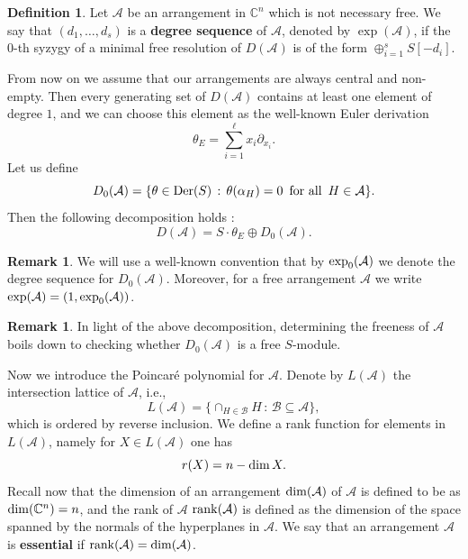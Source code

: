 \documentclass[11pt]{article}
\theoremstyle{plain}
\theoremstyle{definition}
\newtheorem{definition}[thm]{Definition}
\newtheorem{remark}[thm]{Remark}
\begin{document}
\begin{definition}
	Let $\mathcal{A}$ be an arrangement in $\mathbb{C}^n$ which is not necessary free. We say that 
	$(d_1,\ldots,d_s)$ is a \textbf{degree sequence} of $\mathcal{A}$, denoted by $\exp(\mathcal{A})$,  if 
	the $0$-th syzygy of a minimal free resolution of $D(\mathcal{A})$ is of the form 
	$\oplus_{i=1}^s S[-d_i]$.
	\label{degreesequence}
\end{definition}
From now on we assume that our arrangements are always central and non-empty. Then every generating set of $D(\mathcal{A})$ contains at least one element of degree $1$, and we can choose this element as the well-known Euler derivation
$$\theta_{E} = \sum_{i=1}^{\ell}x_{i} \partial_{x_{i}}.$$
Let us define
$$D_{0}(\mathcal{A}) = \{\theta \in {\rm Der}(S) \, : \, \theta(\alpha_{H}) = 0 \, \text{ for all } \, H \in \mathcal{A}\}.$$
Then the following decomposition holds \cite[pp. 151 -- 152]{Dimca}:
$$D(\mathcal{A}) = S\cdot \theta_{E} \oplus D_{0}(\mathcal{A}).$$
\begin{remark}
We will use a well-known convention that by ${\rm exp}_{0}(\mathcal{A})$ we denote the degree sequence for $D_{0}(\mathcal{A})$. Moreover, for a free arrangement $\mathcal{A}$ we write ${\exp}(\mathcal{A}) = (1,{\rm exp}_{0}(\mathcal{A}))$.
\end{remark}
\begin{remark}
In light of the above decomposition, determining the freeness of $\mathcal{A}$ boils down to checking whether $D_{0}(\mathcal{A})$ is a free $S$-module.
\end{remark}
\noindent
Now we introduce the Poincar\'e polynomial for $\mathcal{A}$. Denote by $L(\mathcal{A})$ the intersection lattice of $\mathcal{A}$, i.e.,
$$L(\mathcal{A}) = \{ \cap_{H \in \mathcal{B}}H \, : \, \mathcal{B} \subseteq \mathcal{A}\},$$
which is ordered by reverse inclusion.  We define a rank function for elements in $L(\mathcal{A})$, namely for $X \in L(\mathcal{A})$ one has
$$r(X) = n - {\rm dim} \, X.$$
Recall now that the dimension of an arrangement ${\rm dim}(\mathcal{A})$ of $\mathcal{A}$ is defined to be as ${\rm dim}(\mathbb{C}^{n})=n$, and the rank of $\mathcal{A}$ ${\rm rank}(\mathcal{A})$ is defined as the dimension of the space spanned by the normals of the hyperplanes in $\mathcal{A}$. We say that an arrangement $\mathcal{A}$ is \textbf{essential} if ${\rm rank}(\mathcal{A}) = {\rm dim}(\mathcal{A})$.
\end{document}
